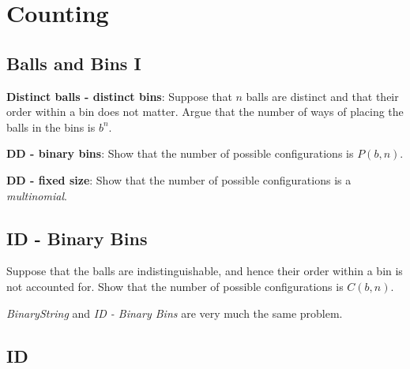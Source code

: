 
\chapter{Counting}








\section{Balls and Bins I}




\begin{example}
\textbf{Distinct balls - distinct bins}:
Suppose that $n$ balls are distinct and that their order within a bin does not
matter. Argue that the number of ways of placing the balls in the bins is $b^n$.
\end{example}



\textbf{DD - binary bins}:
Show that the number of possible configurations is $P(b,n)$.

\textbf{DD - fixed size}:
Show that the number of possible configurations is a \textit{multinomial}.


\section{ID - Binary Bins}


Suppose that the balls are indistinguishable, and hence their order within a bin 
is not accounted for. Show that the number of possible configurations is $C(b, n)$.



\textit{BinaryString} and \textit{ID - Binary Bins} are very much 
the same problem.  

\frmrule






\section{ID}

